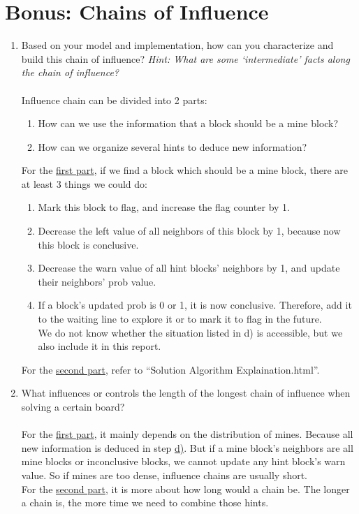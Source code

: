 \documentclass[letter]{article}
\begin{document}
\section{Bonus: Chains of Influence}
\begin{enumerate}
	\item {Based on your model and implementation, how can you characterize and build this chain of influence? \textit{Hint: What are some `intermediate' facts along the chain of influence?}} \\
	\\
	Influence chain can be divided into 2 parts:
	\begin{enumerate}
		\label{firstpart}
		\item {How can we use the information that a block should be a mine block?}
		\label{secondpart}
		\item {How can we organize several hints to deduce new information?}
	\end{enumerate}
	
	For the \hyperref[firstpart]{first part}, if we find a block which should be a mine block, there are at least 3 things we could do:
	\begin{enumerate}
		\item {Mark this block to flag, and increase the flag counter by 1.}
		\item {Decrease the left value of all neighbors of this block by 1, because now this block is conclusive.}
		\item {Decrease the warn value of all hint blocks’ neighbors by 1, and update their neighbors’ prob value.} 
		\label{step-d}
		\item {If a block’s updated prob is 0 or 1, it is now conclusive. Therefore, add it to the waiting line to explore it or to mark it to flag in the future.} \\
		We do not know whether the situation listed in d) is accessible, but we also include it in this report.
	\end{enumerate}
	
	For the \hyperref[secondpart]{second part}, refer to “Solution Algorithm Explaination.html”.
	
	\item {What influences or controls the length of the longest chain of influence when solving a certain board?} \\
	\\
	For the \hyperref[firstpart]{first part}, it mainly depends on the distribution of mines. Because all new information is deduced in step \hyperref[step-d]{d)}. But if a mine block’s neighbors are all mine blocks or inconclusive blocks, we cannot update any hint block’s warn value. So if mines are too dense, influence chains are usually short. \\
	For the \hyperref[secondpart]{second part}, it is more about how long would a chain be. The longer a chain is, the more time we need to combine those hints. \\
	

\end{enumerate}
\end{document}

